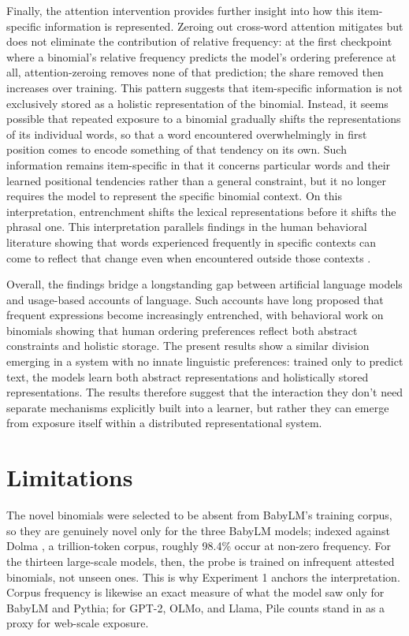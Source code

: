 \documentclass[11pt]{article}
\begin{document}
Finally, the attention intervention provides further insight into how
this item-specific information is represented. Zeroing out cross-word
attention mitigates but does not eliminate the contribution of relative
frequency: at the first checkpoint where a binomial's relative frequency
predicts the model's ordering preference at all, attention-zeroing
removes none of that prediction; the share removed then increases over
training. This pattern suggests that item-specific information is not
exclusively stored as a holistic representation of the binomial.
Instead, it seems possible that repeated exposure to a binomial
gradually shifts the representations of its individual words, so that a
word encountered overwhelmingly in first position comes to encode
something of that tendency on its own. Such information remains
item-specific in that it concerns particular words and their learned
positional tendencies rather than a general constraint, but it no longer
requires the model to represent the specific binomial context. On this
interpretation, entrenchment shifts the lexical representations before
it shifts the phrasal one. This interpretation parallels findings in the
human behavioral literature showing that words experienced frequently in
specific contexts can come to reflect that change even when encountered
outside those contexts \citep{kapatsinski2026lexical}.

Overall, the findings bridge a longstanding gap between artificial
language models and usage-based accounts of language. Such accounts have
long proposed that frequent expressions become increasingly entrenched,
with behavioral work on binomials showing that human ordering
preferences reflect both abstract constraints and holistic storage. The
present results show a similar division emerging in a system with no
innate linguistic preferences: trained only to predict text, the models
learn both abstract representations and holistically stored
representations. The results therefore suggest that the interaction they
don't need separate mechanisms explicitly built into a learner, but
rather they can emerge from exposure itself within a distributed
representational system.

\section*{Limitations}\label{limitations}

The novel binomials were selected to be absent from BabyLM's training
corpus, so they are genuinely novel only for the three BabyLM models;
indexed against Dolma \citep{dolma}, a trillion-token corpus, roughly
98.4\% occur at non-zero frequency. For the thirteen large-scale models,
then, the probe is trained on infrequent attested binomials, not unseen
ones. This is why Experiment 1 anchors the interpretation. Corpus
frequency is likewise an exact measure of what the model saw only for
BabyLM and Pythia; for GPT-2, OLMo, and Llama, Pile counts stand in as a
proxy for web-scale exposure.
\end{document}
